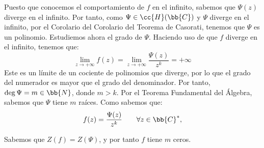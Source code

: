 \documentclass[12pt]{article}
\begin{document}
\begin{ejercicio}[2.5 puntos]
        Puesto que conocemos el comportamiento de $f$ en el infinito, sabemos que $\Psi(z)$ diverge en el infinito. Por tanto, como $\Psi\in \cc{H}(\bb{C})$ y $\Psi$ diverge en el infinito, por el Corolario del Corolario del Teorema de Casorati, tenemos que $\Psi$ es un polinomio. Estudiemos ahora el grado de $\Psi$. Haciendo uso de que $f$ diverge en el infinito, tenemos que:
        \begin{equation*}
            \lim_{z\to +\infty} f(z) = \lim_{z\to +\infty} \dfrac{\Psi(z)}{z^k} = +\infty
        \end{equation*}
        Este es un límite de un cociente de polinomios que diverge, por lo que el grado del numerador es mayor que el grado del denominador. Por tanto, $\deg \Psi = m\in \bb{N}$, donde $m>k$. Por el Teorema Fundamental del Álgebra, sabemos que $\Psi$ tiene $m$ raíces. Como sabemos que:
        \begin{equation*}
            f(z) = \dfrac{\Psi(z)}{z^k}\qquad \forall z\in \bb{C}^*,
        \end{equation*}

        Sabemos que $Z(f) = Z(\Psi)$, y por tanto $f$ tiene $m$ ceros.
    \end{ejercicio}
\end{document}

